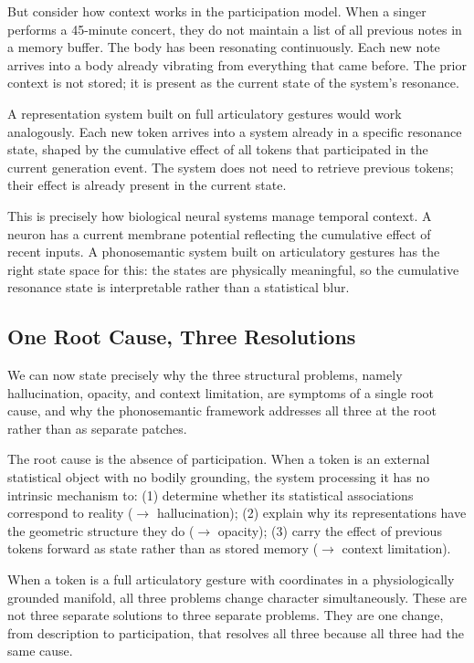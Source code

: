 \documentclass[12pt]{article}
\begin{document}
But consider how context works in the participation model. When a singer performs a 45-minute concert, they do not maintain a list of all previous notes in a memory buffer. The body has been resonating continuously. Each new note arrives into a body already vibrating from everything that came before. The prior context is not stored; it is present as the current state of the system's resonance.

A representation system built on full articulatory gestures would work analogously. Each new token arrives into a system already in a specific resonance state, shaped by the cumulative effect of all tokens that participated in the current generation event. The system does not need to retrieve previous tokens; their effect is already present in the current state.

This is precisely how biological neural systems manage temporal context. A neuron has a current membrane potential reflecting the cumulative effect of recent inputs. A phonosemantic system built on articulatory gestures has the right state space for this: the states are physically meaningful, so the cumulative resonance state is interpretable rather than a statistical blur.

\subsection{One Root Cause, Three Resolutions}

We can now state precisely why the three structural problems, namely hallucination, opacity, and context limitation, are symptoms of a single root cause, and why the phonosemantic framework addresses all three at the root rather than as separate patches.

The root cause is the absence of participation. When a token is an external statistical object with no bodily grounding, the system processing it has no intrinsic mechanism to: (1) determine whether its statistical associations correspond to reality ($\to$ hallucination); (2) explain why its representations have the geometric structure they do ($\to$ opacity); (3) carry the effect of previous tokens forward as state rather than as stored memory ($\to$ context limitation).

When a token is a full articulatory gesture with coordinates in a physiologically grounded manifold, all three problems change character simultaneously. These are not three separate solutions to three separate problems. They are one change, from description to participation, that resolves all three because all three had the same cause.
\end{document}
